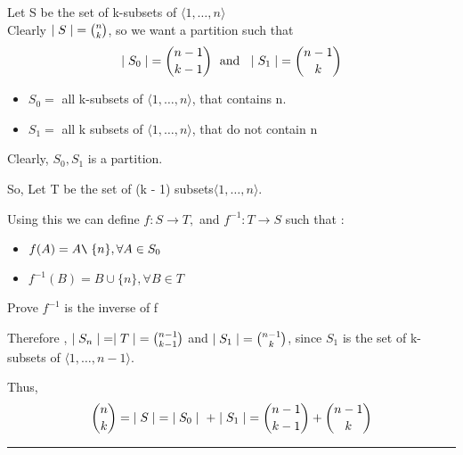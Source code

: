 \documentclass{article}
\newcommand{\bs}{
		\texttt{\char`\\ \hspace{0.1cm}} 
	}
\newenvironment{proof}{{\bf Proof:}}{\hfill\rule{2mm}{2mm}}
\newenvironment{exblock}[1]{%
    \tcolorbox[beamer,%
    noparskip,breakable,
    colback=lightgreen,colframe=darkgreen,%
    colbacklower=limegreen!75!lightgreen,%
    title=#1]}%
    {\endtcolorbox}
\newenvironment{ablock}[1]{%
    \tcolorbox[beamer,%
    noparskip,breakable,
    colback=lightcoral,colframe=darkred,%
    colbacklower=tomato!75!lightcoral,%
    title=#1]}%
    {\endtcolorbox}
\begin{document}
\begin{proof}
Let S be the set of k-subsets of \(\langle 1, \ldots, n \rangle\) \\
Clearly \(\mid S \mid \hspace{0.1cm} = {n \choose k}\), so we want a partition such that 
\[\mid S_0 \mid \hspace{0.1cm} = {{n-1}\choose {k-1}} \hspace{0.1cm} \text{ and } \hspace{0.1cm} 
\mid S_1 \mid \hspace{0.1cm} = {{n-1}\choose k}\]
\begin{ablock}{Define}
\begin{itemize}
\item \(S_0 = \) all k-subsets of \(\langle 1, \ldots, n \rangle\), that contains n.
\item \(S_1 = \) all k subsets of  \(\langle 1, \ldots, n \rangle\), that do not contain n
\end{itemize}

Clearly, \(S_0 , S_1\) is a partition.
\end{ablock}

So, Let T be the set of (k - 1) subsets\(\langle 1, \ldots, n \rangle\). 

Using this we can define \(f : S \rightarrow T,\) and \(f^{-1} : T \rightarrow S \) such that : 

\begin{itemize}
\item \(f(A) = A \bs \{n\} , \forall A \in S_0 \)
\item \(f^{-1}(B) = B \cup \{n\} , \forall B \in T \)
\end{itemize}

\begin{exblock}{Exercise}
Prove \(f^{-1}\) is the inverse of f 
\end{exblock}

Therefore , \(\mid S_n \mid  \hspace{0.1cm} = \mid T \mid \hspace{0.1cm} = {{n - 1} \choose {k - 1}} \) and \(\mid S_1 \mid \hspace{0.1cm} = {{n-1} \choose k}\), since \(S_1\) is the set of k-subsets of \(\langle 1, \ldots, n -1 \rangle\). 

Thus, 
\[{n \choose k} = \hspace{0.1cm} \mid S \mid \hspace{0.1cm} = \hspace{0.1cm} \mid S_0 \mid \hspace{0.1cm} + \mid S_1 \mid  \hspace{0.1cm} = {{n-1} \choose {k-1}} + {{n-1} \choose k}\]
\end{proof}
\end{document}
